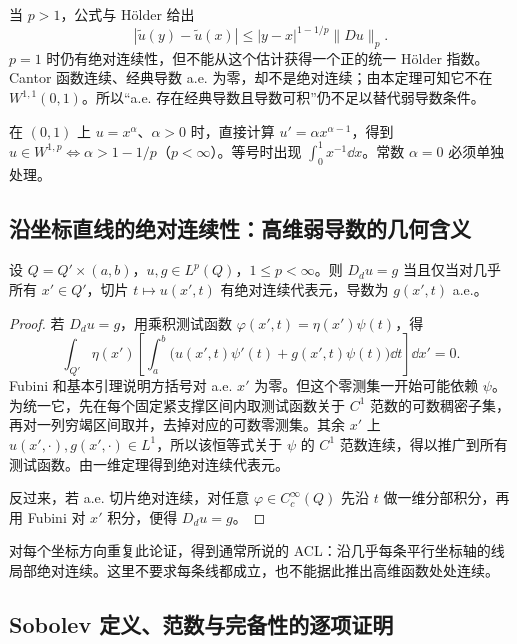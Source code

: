当 $p>1$，公式与 H\"older 给出
\[
 |\widetilde u(y)-\widetilde u(x)|
 \le|y-x|^{1-1/p}\|Du\|_p.
\]
$p=1$ 时仍有绝对连续性，但不能从这个估计获得一个正的统一 H\"older 指数。Cantor 函数连续、经典导数 a.e. 为零，却不是绝对连续；由本定理可知它不在 $W^{1,1}(0,1)$。所以“a.e. 存在经典导数且导数可积”仍不足以替代弱导数条件。

在 $(0,1)$ 上 $u=x^\alpha$、$\alpha>0$ 时，直接计算 $u'=\alpha x^{\alpha-1}$，得到 $u\in W^{1,p}\iff\alpha>1-1/p$（$p<\infty$）。等号时出现 $\int_0^1x^{-1}\dd x$。常数 $\alpha=0$ 必须单独处理。

\subsection{沿坐标直线的绝对连续性：高维弱导数的几何含义}

\begin{proposition}[长方体上的切片刻画]\label{prop:weak-acl}
设 $Q=Q'\times(a,b)$，$u,g\in L^p(Q)$，$1\le p<\infty$。则 $D_d u=g$ 当且仅当对几乎所有 $x'\in Q'$，切片 $t\mapsto u(x',t)$ 有绝对连续代表元，导数为 $g(x',t)$ a.e.。
\end{proposition}
\begin{proof}
若 $D_du=g$，用乘积测试函数 $\varphi(x',t)=\eta(x')\psi(t)$，得
\[
 \int_{Q'}\eta(x')\left[\int_a^b
       \big(u(x',t)\psi'(t)+g(x',t)\psi(t)\big)\dd t\right]\dd x'=0.
\]
Fubini 和基本引理说明方括号对 a.e. $x'$ 为零。但这个零测集一开始可能依赖 $\psi$。为统一它，先在每个固定紧支撑区间内取测试函数关于 $C^1$ 范数的可数稠密子集，再对一列穷竭区间取并，去掉对应的可数零测集。其余 $x'$ 上 $u(x',\cdot),g(x',\cdot)\in L^1$，所以该恒等式关于 $\psi$ 的 $C^1$ 范数连续，得以推广到所有测试函数。由一维定理得到绝对连续代表元。

反过来，若 a.e. 切片绝对连续，对任意 $\varphi\in C_c^\infty(Q)$ 先沿 $t$ 做一维分部积分，再用 Fubini 对 $x'$ 积分，便得 $D_du=g$。
\end{proof}
对每个坐标方向重复此论证，得到通常所说的 ACL：沿几乎每条平行坐标轴的线局部绝对连续。这里不要求每条线都成立，也不能据此推出高维函数处处连续。

\subsection{Sobolev 定义、范数与完备性的逐项证明}

